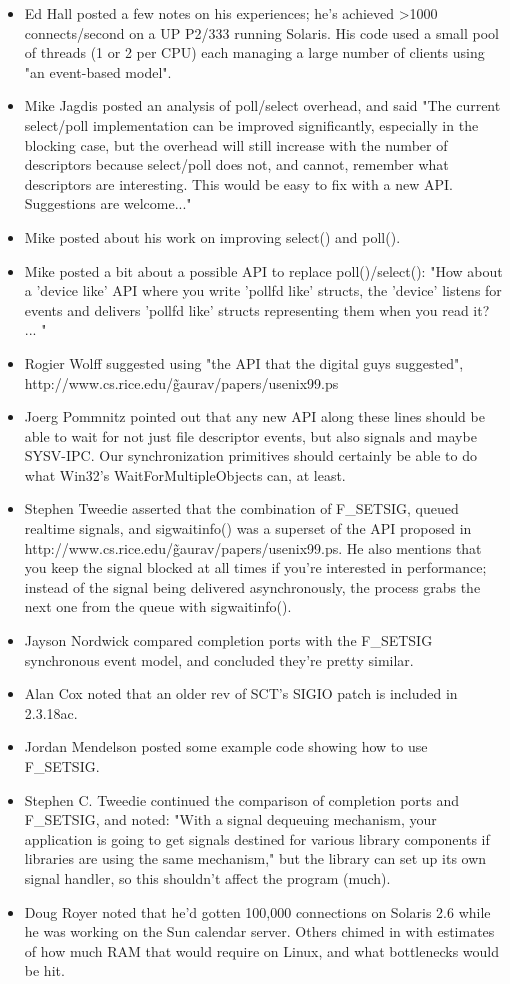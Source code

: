 \documentclass[twoside, xetex]{report}
\begin{document}
\begin{itemize}
\item Ed Hall posted a few notes on his experiences; he's achieved >1000 connects/second on a UP P2/333 running Solaris. His code used a small pool of threads (1 or 2 per CPU) each managing a large number of clients using "an event-based model".
\item Mike Jagdis posted an analysis of poll/select overhead, and said "The current select/poll implementation can be improved significantly, especially in the blocking case, but the overhead will still increase with the number of descriptors because select/poll does not, and cannot, remember what descriptors are interesting. This would be easy to fix with a new API. Suggestions are welcome..."
\item Mike posted about his work on improving select() and poll().
\item Mike posted a bit about a possible API to replace poll()/select(): "How about a 'device like' API where you write 'pollfd like' structs, the 'device' listens for events and delivers 'pollfd like' structs representing them when you read it? ... "
\item Rogier Wolff suggested using "the API that the digital guys suggested", \\http://www.cs.rice.edu/\~gaurav/papers/usenix99.ps
\item Joerg Pommnitz pointed out that any new API along these lines should be able to wait for not just file descriptor events, but also signals and maybe SYSV-IPC. Our synchronization primitives should certainly be able to do what Win32's WaitForMultipleObjects can, at least.
\item Stephen Tweedie asserted that the combination of F\_SETSIG, queued realtime signals, and sigwaitinfo() was a superset of the API proposed in\\ http://www.cs.rice.edu/\~gaurav/papers/usenix99.ps. He also mentions that you keep the signal blocked at all times if you're interested in performance; instead of the signal being delivered asynchronously, the process grabs the next one from the queue with sigwaitinfo().
\item Jayson Nordwick compared completion ports with the F\_SETSIG synchronous event model, and concluded they're pretty similar.
\item Alan Cox noted that an older rev of SCT's SIGIO patch is included in 2.3.18ac.
\item Jordan Mendelson posted some example code showing how to use F\_SETSIG.
\item Stephen C. Tweedie continued the comparison of completion ports and F\_SETSIG, and noted: "With a signal dequeuing mechanism, your application is going to get signals destined for various library components if libraries are using the same mechanism," but the library can set up its own signal handler, so this shouldn't affect the program (much).
\item Doug Royer noted that he'd gotten 100,000 connections on Solaris 2.6 while he was working on the Sun calendar server. Others chimed in with estimates of how much RAM that would require on Linux, and what bottlenecks would be hit.
\end{itemize}
\end{document}
